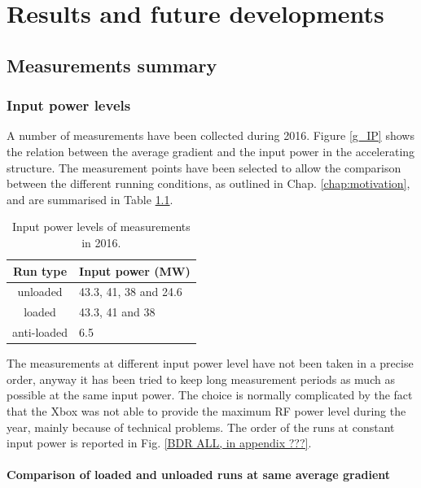 \chapter[Results and future developments]{Results and future developments}

\section[Measurements summary]{Measurements summary}

\subsection[Input power levels]{Input power levels}

A number of measurements have been collected during 2016. Figure \ref{g_IP} shows the relation between the average gradient and the input power in the accelerating structure. The measurement points have been selected to allow the comparison between the different running conditions, as outlined in Chap. \ref{chap:motivation}, and are summarised in Table \ref{run_pwr}.

\begin{table}
  \centering
    \begin{tabular}{ c l }
    \hline
    \hline
    Run type		&	Input power (MW)		\\
    \hline
    unloaded 		&	43.3, 41, 38 and 24.6	\\
    loaded			&	43.3, 41 and 38			\\
    anti-loaded		&	6.5					\\
    \hline
    \hline
    \end{tabular}
\caption{Input power levels of measurements in 2016.}
\label{run_pwr}
\end{table}

The measurements at different input power level have not been taken in a precise order, anyway it has been tried to keep long measurement periods as much as possible at the same input power. 
The choice is normally complicated by the fact that the Xbox was not able to provide the maximum RF power level during the year, mainly because of technical problems. The order of the runs at constant input power is reported in Fig. \ref{BDR ALL, in appendix ???}.


\subsubsection{Comparison of loaded and unloaded runs at same average gradient}

